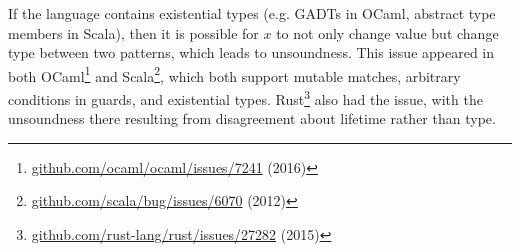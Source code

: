 \documentclass[11pt,oneside]{article}
\begin{document}
If the language contains existential types (e.g. GADTs in OCaml, abstract type members in Scala), then it is possible for \(x\) to not only change value but change type between two patterns, which leads to unsoundness. This issue appeared in both OCaml\footnote{\href{https://github.com/ocaml/ocaml/issues/7241}{github.com/\allowbreak{}ocaml/\allowbreak{}ocaml/\allowbreak{}issues/\allowbreak{}7241} (2016)} and Scala\footnote{\href{https://github.com/scala/bug/issues/6070}{github.com/\allowbreak{}scala/\allowbreak{}bug/\allowbreak{}issues/\allowbreak{}6070} (2012)}, which both support mutable matches, arbitrary conditions in guards, and existential types. Rust\footnote{\href{https://github.com/rust-lang/rust/issues/27282}{github.com/\allowbreak{}rust-lang/\allowbreak{}rust/\allowbreak{}issues/\allowbreak{}27282} (2015)} also had the issue, with the unsoundness there resulting from disagreement about lifetime rather than type.
\end{document}
